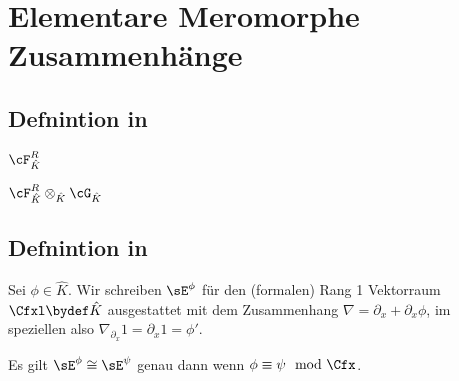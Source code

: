 \chapter{Elementare Meromorphe Zusammenhänge}
\begin{comment}
einführen als Bausteine oder kleinste Meromorphe Zusammenhänge
\end{comment}

\section{Defnintion in \cite{sabbah_cimpa90}}
\begin{comment}
in \cite{sabbah_cimpa90} Teil 5.4.4 Seite 34
\end{comment}
\begin{defn}
$\cF_{\hat K}^R$
\end{defn}
\begin{defn}
$\cF_{\hat K}^R\otimes_{\hat K} \cG_{\hat K}$
\end{defn}

\section{Defnintion in \cite{sabbah_Fourier-local}}
\begin{defn}
\cite[1.a]{sabbah_Fourier-local}
Sei $\phi\in\hat K$.
Wir schreiben $\sE^\phi$ für den (formalen) Rang 1 Vektorraum $\Cfxl \bydef
\hat K$ ausgestattet mit dem Zusammenhang $\nabla=\partial_x+\partial_x\phi$,
im speziellen also $\nabla_{\partial_x}1=\partial_x1=\phi'$.\\
\begin{comment}
Also
\begin{align*}
\sE^\phi=\Cfxl & \overset{\partial_x}{\rightarrow} \Cfxl\\
1              & \mapsto \phi'(x)\\
f(x)           & \mapsto f'(x)+f(x)\phi'(x)\\
\end{align*}
\end{comment}
\end{defn}

\begin{bem} \label{bem:FormRang1VR}
\cite[1.a]{sabbah_Fourier-local}
Es gilt $\sE^\phi\cong\sE^\psi$ genau dann wenn $\phi\equiv\psi \mod \Cfx$.
\end{bem}

